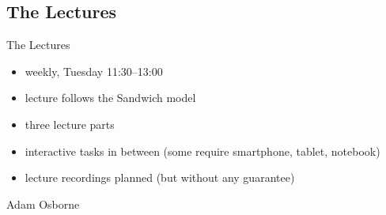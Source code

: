 
\subsection{The Lectures}
\begin{frame}{\insertsubsection}
	\begin{fancycolumns}[widths={60}]
		\begin{definition}{The Lectures}
			\begin{itemize}
				\item weekly, Tuesday 11:30--13:00
				\item lecture follows the Sandwich model
				\item three lecture parts
				\item interactive tasks in between (some require smartphone, tablet, notebook)
				\item lecture recordings planned (but without any guarantee)
			\end{itemize}
		\end{definition}
	\nextcolumn
		\begin{note}{Adam Osborne} %
		\end{note}
	\end{fancycolumns}
\end{frame}

